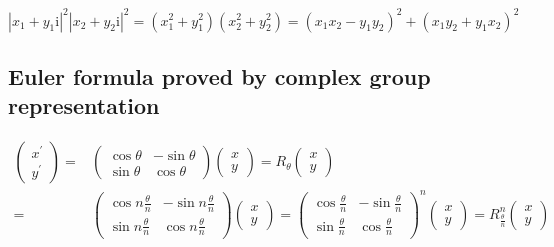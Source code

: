 \documentclass[
]{book}
\theoremstyle{definition}
\theoremstyle{definition}
\theoremstyle{definition}
\theoremstyle{definition}
\theoremstyle{remark}
\begin{document}
\[
\left|x_{{\scriptscriptstyle 1}}+y_{{\scriptscriptstyle 1}}\mathrm{i}\right|^{2}\left|x_{{\scriptscriptstyle 2}}+y_{{\scriptscriptstyle 2}}\mathrm{i}\right|^{2}=\left(x_{{\scriptscriptstyle 1}}^{2}+y_{{\scriptscriptstyle 1}}^{2}\right)\left(x_{{\scriptscriptstyle 2}}^{2}+y_{{\scriptscriptstyle 2}}^{2}\right)=\left(x_{{\scriptscriptstyle 1}}x_{{\scriptscriptstyle 2}}-y_{{\scriptscriptstyle 1}}y_{{\scriptscriptstyle 2}}\right)^{2}+\left(x_{{\scriptscriptstyle 1}}y_{{\scriptscriptstyle 2}}+y_{{\scriptscriptstyle 1}}x_{{\scriptscriptstyle 2}}\right)^{2}
\]

\hypertarget{euler-formula-proved-by-complex-group-representation}{%
\subsection{Euler formula proved by complex group representation}\label{euler-formula-proved-by-complex-group-representation}}

\[
\begin{aligned}
\begin{pmatrix}x^{\prime}\\
y^{\prime}
\end{pmatrix}= & \begin{pmatrix}\cos\theta & -\sin\theta\\
\sin\theta & \cos\theta
\end{pmatrix}\begin{pmatrix}x\\
y
\end{pmatrix}=R_{{\scriptscriptstyle \theta}}\begin{pmatrix}x\\
y
\end{pmatrix}\\
= & \begin{pmatrix}\cos n\frac{\theta}{n} & -\sin n\frac{\theta}{n}\\
\sin n\frac{\theta}{n} & \cos n\frac{\theta}{n}
\end{pmatrix}\begin{pmatrix}x\\
y
\end{pmatrix}=\begin{pmatrix}\cos\frac{\theta}{n} & -\sin\frac{\theta}{n}\\
\sin\frac{\theta}{n} & \cos\frac{\theta}{n}
\end{pmatrix}^{n}\begin{pmatrix}x\\
y
\end{pmatrix}=R_{{\scriptscriptstyle \frac{\theta}{n}}}^{n}\begin{pmatrix}x\\
y
\end{pmatrix}
\end{aligned}
\]
\end{document}
